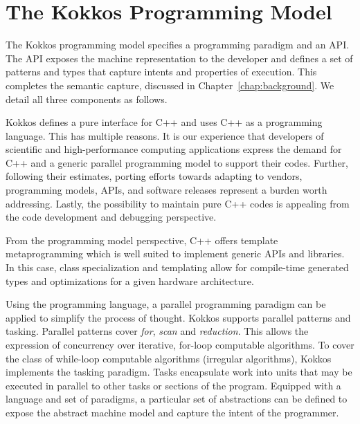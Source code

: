\section{The Kokkos Programming Model}\label{chap:kokkosPM}

The Kokkos programming model specifies a programming paradigm and an API. The API exposes the machine representation to the developer and defines a set of patterns and types that capture intents and properties of execution. This completes the semantic capture, discussed in Chapter~\ref{chap:background}. We detail all three components as follows.

Kokkos defines a pure interface for C++ and uses C++ as a programming language. This has multiple reasons. It is our experience that developers of scientific and high-performance computing applications express the demand for C++ and a generic parallel programming model to support their codes. Further, following their estimates, porting efforts towards adapting to vendors, programming models, APIs, and software releases represent a burden worth addressing. Lastly, the possibility to maintain pure C++ codes is appealing from the code development and debugging perspective. 

From the programming model perspective, C++ offers template metaprogramming which is well suited to implement generic APIs and libraries. In this case, class specialization and templating allow for compile-time generated types and optimizations for a given hardware architecture. 

Using the programming language, a parallel programming paradigm can be applied to simplify the process of thought. Kokkos supports parallel patterns and tasking. Parallel patterns cover \emph{for}, \emph{scan} and \emph{reduction}. This allows the expression of concurrency over iterative, for-loop computable algorithms. To cover the class of while-loop computable algorithms (irregular algorithms), Kokkos implements the tasking paradigm. Tasks encapsulate work into units that may be executed in parallel to other tasks or sections of the program. Equipped with a language and set of paradigms, a particular set of abstractions can be defined to expose the abstract machine model and capture the intent of the programmer.

